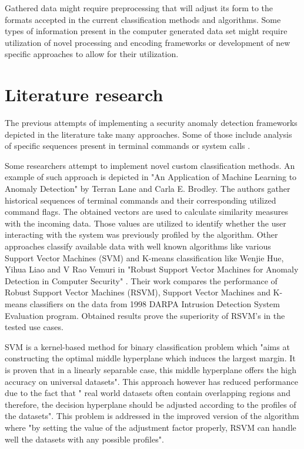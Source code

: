 \documentclass[a4paper,twoside,12pt]{book}
\begin{document}
Gathered data might require preprocessing that will adjust its form to the formats accepted in the
current classification methods and algorithms. Some types of information present in the computer 
generated data set might require utilization of novel processing and encoding frameworks or 
development of new specific approaches to allow for their utilization.  

\section{Literature research}

The previous attempts of implementing a security anomaly detection frameworks depicted in the 
literature take many approaches. Some of those include analysis of specific sequences
present in terminal commands \cite{bib:lane1997application} or system calls \cite{bib:forest}. 

Some researchers attempt to implement novel custom classification methods. An example of such 
approach is depicted in "An Application of Machine Learning to Anomaly Detection" by Terran Lane 
and Carla E. Brodley\cite{bib:lane1997application}. The authors gather historical sequences of
terminal commands and their corresponding utilized command flags. The obtained vectors are used
to calculate similarity measures with the incoming data. Those values are utilized to identify 
whether the user interacting with the system was previously profiled by the algorithm.
Other approaches classify available data with well known algorithms like various Support Vector 
Machines (SVM) and K-means classification like Wenjie Hue, Yihua Liao and V Rao Vemuri in "Robust Support Vector 
Machines for Anomaly Detection in Computer Security" \cite{bib:rsvm}. Their work compares the 
performance of Robust Support Vector Machines (RSVM), Support Vector Machines and K-means classifiers
on the data from 1998 DARPA Intrusion Detection System Evaluation program. Obtained results
prove the superiority of RSVM's in the tested use cases. 

SVM is a kernel-based method for binary classification problem which "aims at constructing 
the optimal middle hyperplane which induces the largest margin. It is proven that in a linearly 
separable case, this middle hyperplane offers the high accuracy on universal datasets". This 
approach however has reduced performance due to the fact that " real world datasets often contain 
overlapping regions and therefore, the decision hyperplane should be adjusted according to the 
profiles of the datasets". This problem is addressed in the improved version of the algorithm
where "by setting the value of the adjustment factor properly, RSVM can handle well the datasets 
with any possible profiles"\cite{bib:svmandrsvm}.
\end{document}
